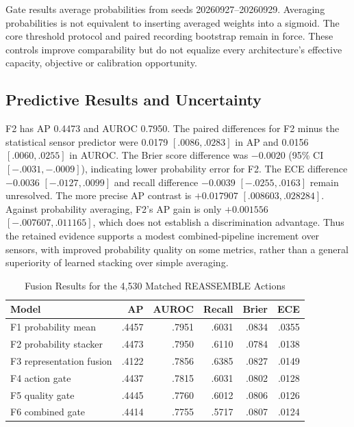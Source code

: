 Gate results average probabilities from seeds 20260927--20260929. Averaging
probabilities is not equivalent to inserting averaged weights into a sigmoid. The core
threshold protocol and paired recording bootstrap remain in force. These controls
improve comparability but do not equalize every architecture's effective capacity,
objective or calibration opportunity.

\subsection{Predictive Results and Uncertainty}
F2 has AP 0.4473 and AUROC 0.7950. The paired differences for F2 minus the statistical
sensor predictor were 0.0179 $[.0086,.0283]$ in AP and 0.0156 $[.0060,.0255]$ in AUROC.
The Brier score difference was $-0.0020$ (95\% CI $[-.0031,-.0009]$), indicating lower
probability error for F2. The ECE difference $-0.0036$ $[-.0127,.0099]$ and recall
difference $-0.0039$ $[-.0255,.0163]$ remain unresolved. The more precise AP contrast is
$+0.017907$ $[.008603,.028284]$. Against probability averaging, F2's AP gain is only
$+0.001556$ $[-.007607,.011165]$, which does not establish a discrimination advantage.
Thus the retained evidence supports a modest combined-pipeline increment over sensors,
with improved probability quality on some metrics, rather than a general superiority of
learned stacking over simple averaging.

\begin{table}[htbp]
\caption{Fusion Results for the 4,530 Matched REASSEMBLE Actions}\label{tab:reassemble-fusion}
\centering\small

\begin{tabular}{lrrrrr}\hline
Model & AP & AUROC & Recall & Brier & ECE\\\hline
F1 probability mean & .4457 & .7951 & .6031 & .0834 & .0355\\
F2 probability stacker & .4473 & .7950 & .6110 & .0784 & .0138\\
F3 representation fusion & .4122 & .7856 & .6385 & .0827 & .0149\\
F4 action gate & .4437 & .7815 & .6031 & .0802 & .0128\\
F5 quality gate & .4445 & .7760 & .6012 & .0806 & .0126\\
F6 combined gate & .4414 & .7755 & .5717 & .0807 & .0124\\\hline
\end{tabular}
\end{table}

